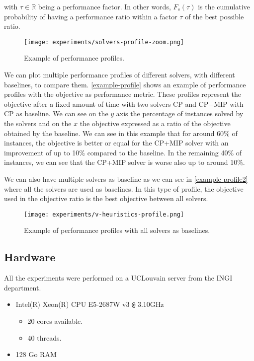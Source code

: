 \documentclass[../../thesis.tex]{subfiles}
\begin{document}
with $\tau \in \mathbb{R}$ being a performance factor. In other words, $F_s(\tau)$ is the cumulative probability
of having a performance ratio within a factor $\tau$ of the best possible ratio.

\begin{figure}
  \centering
  \texttt{[image: experiments/solvers-profile-zoom.png]}
  \caption{Example of performance profiles.}
  \label{example-profile}
\end{figure}

We can plot multiple performance profiles of different solvers, with different baselines, to compare them.
\autoref{example-profile} shows an example of performance profiles with the objective as performance metric.
These profiles represent the objective after a fixed amount of time 
with two solvers CP and CP+MIP with CP as 
baseline.
We can see on the $y$ axis the percentage of instances solved by the solvers and on the $x$ the objective expressed
as a ratio of the objective obtained by the baseline. We can see in this example that for around 60\% of instances,
the objective is better or equal for the CP+MIP solver with an improvement of up to 10\% compared to the baseline.
In the remaining 40\% of instances, we can see that the CP+MIP solver is worse also up to around 10\%.


We can also have multiple solvers as baseline as we can see in \autoref{example-profile2} where all the solvers 
are used as baselines. In this type of profile, the objective used in the objective ratio is the best objective between all solvers.

\begin{figure}
  \centering
  \texttt{[image: experiments/v-heuristics-profile.png]}
  \caption{Example of performance profiles with all solvers as baselines.}
  \label{example-profile2}
\end{figure}


\subsection{Hardware}

All the experiments were performed on a UCLouvain server \cite{jabba} from the INGI department.

\begin{itemize}
  \item Intel(R) Xeon(R) CPU E5-2687W v3 \verb+@+ 3.10GHz 
    \begin{itemize}
      \item 20 cores available.
      \item 40 threads.
    \end{itemize}
  \item 128 Go RAM
\end{itemize}
\end{document}
